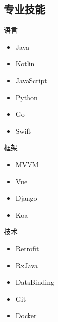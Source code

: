 \documentclass[11pt]{res}
\begin{document}
\begin{resume}
\section{专业技能}
  \begin{multicols}{3}
    语言
    \begin{itemize}
      \item Java
      \item Kotlin
      \item JavaScript
      \item Python
      \item Go
      \item Swift
    \end{itemize}
    框架
    \begin{itemize}
      \item MVVM
      \item Vue
      \item Django
      \item Koa
    \end{itemize}
    技术
    \begin{itemize}
      \item Retrofit
      \item RxJava
      \item DataBinding
      \item Git
      \item Docker
    \end{itemize}
  \end{multicols}


\end{resume}
\end{document}
